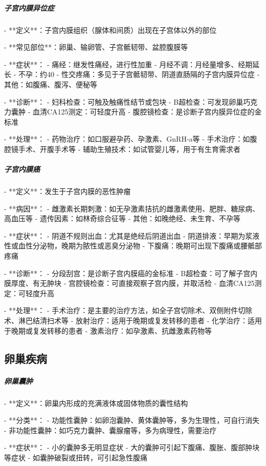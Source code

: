 \begin{enumerate}
\subparagraph{子宫内膜异位症}

- **定义**：子宫内膜组织（腺体和间质）出现在子宫体以外的部位

- **常见部位**：卵巢、输卵管、子宫骶韧带、盆腔腹膜等

- **症状**：
  - 痛经：继发性痛经，进行性加重
  - 月经不调：月经量增多、经期延长
  - 不孕：约40%
  - 性交疼痛：多见于子宫骶韧带、阴道直肠隔的子宫内膜异位症
  - 其他：如腹痛、腹泻、便秘等

- **诊断**：
  - 妇科检查：可触及触痛性结节或包块
  - B超检查：可发现卵巢巧克力囊肿
  - 血清CA125测定：可轻度升高
  - 腹腔镜检查：是诊断子宫内膜异位症的金标准

- **处理**：
  - 药物治疗：如口服避孕药、孕激素、GnRH-a等
  - 手术治疗：如腹腔镜手术、开腹手术等
  - 辅助生殖技术：如试管婴儿等，用于有生育需求者

\subparagraph{子宫内膜癌}

- **定义**：发生于子宫内膜的恶性肿瘤

- **病因**：
  - 雌激素长期刺激：如无孕激素拮抗的雌激素使用、肥胖、糖尿病、高血压等
  - 遗传因素：如林奇综合征等
  - 其他：如晚绝经、未生育、不孕等

- **症状**：
  - 阴道不规则出血：尤其是绝经后阴道出血
  - 阴道排液：早期为浆液性或血性分泌物，晚期为脓性或恶臭分泌物
  - 下腹痛：晚期可出现下腹痛或腰骶部疼痛

- **诊断**：
  - 分段刮宫：是诊断子宫内膜癌的金标准
  - B超检查：可了解子宫内膜厚度、有无肿块
  - 宫腔镜检查：可直接观察子宫内膜，并取活检
  - 血清CA125测定：可轻度升高

- **处理**：
  - 手术治疗：是主要的治疗方法，如全子宫切除术、双侧附件切除术、淋巴结清扫术等
  - 放射治疗：适用于晚期或复发转移的患者
  - 化学治疗：适用于晚期或复发转移的患者
  - 激素治疗：如孕激素、抗雌激素药物等

\subsection{卵巢疾病}

\subparagraph{卵巢囊肿}

- **定义**：卵巢内形成的充满液体或固体物质的囊性结构

- **分类**：
  - 功能性囊肿：如卵泡囊肿、黄体囊肿等，多为生理性，可自行消失
  - 非功能性囊肿：如巧克力囊肿、囊腺瘤等，多为病理性，需要治疗

- **症状**：
  - 小的囊肿多无明显症状
  - 大的囊肿可引起下腹痛、腹胀、腹部肿块等症状
  - 如囊肿破裂或扭转，可引起急性腹痛


\end{enumerate}
